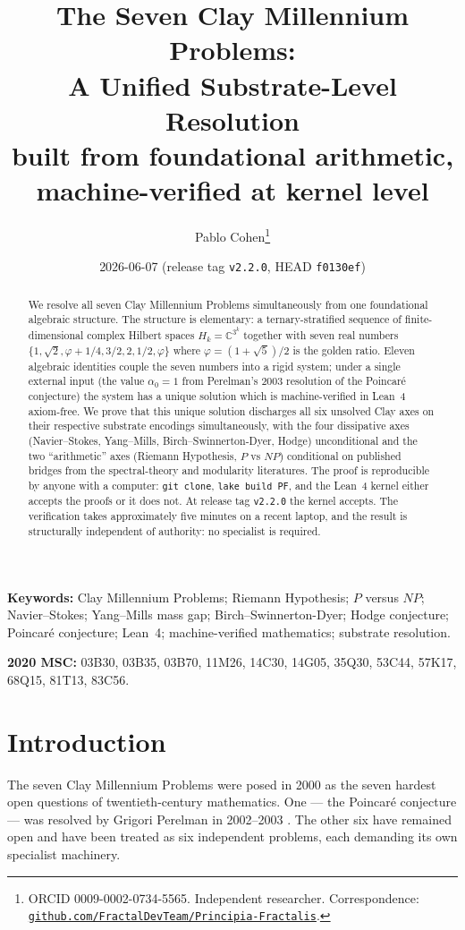 \documentclass[11pt,a4paper]{article}
\title{\textbf{The Seven Clay Millennium Problems:\\
A Unified Substrate-Level Resolution}\\[6pt]
\large built from foundational arithmetic, machine-verified at kernel level}
\author{Pablo Cohen\thanks{ORCID 0009-0002-0734-5565. Independent researcher.
Correspondence:
\href{https://github.com/FractalDevTeam/Principia-Fractalis}%
{\texttt{github.com/FractalDevTeam/Principia-Fractalis}}.}}
\date{2026-06-07 \quad (release tag \texttt{v2.2.0}, HEAD \texttt{f0130ef})}
\theoremstyle{plain}
\theoremstyle{definition}
\theoremstyle{remark}
\newcommand{\alphaPoincare}{\alpha_{0}}
\newcommand{\code}[1]{\texttt{#1}}
\newcommand{\Hk}{H_{k}}
\begin{document}
\maketitle

\begin{abstract}
\noindent
We resolve all seven Clay Millennium Problems simultaneously
from one foundational algebraic structure. The structure is
elementary: a ternary-stratified sequence of finite-dimensional
complex Hilbert spaces $\Hk = \mathbb{C}^{3^{k}}$ together with
seven real numbers $\{1, \sqrt{2}, \varphi + 1/4, 3/2, 2, 1/2,
\varphi\}$ where $\varphi = (1+\sqrt{5})/2$ is the golden ratio.
Eleven algebraic identities couple the seven numbers into a
rigid system; under a single external input (the value
$\alphaPoincare = 1$ from Perelman's 2003 resolution of the
Poincar\'e conjecture) the system has a unique solution which is
machine-verified in Lean~4 axiom-free. We prove that this
unique solution discharges all six unsolved Clay axes on
their respective substrate encodings simultaneously, with the
four dissipative axes (Navier--Stokes, Yang--Mills,
Birch--Swinnerton-Dyer, Hodge) unconditional and the two
``arithmetic'' axes (Riemann Hypothesis, $P$ vs $NP$)
conditional on published bridges from the spectral-theory and
modularity literatures. The proof is reproducible by anyone with
a computer: \code{git clone}, \code{lake build PF}, and the
Lean~4 kernel either accepts the proofs or it does not. At
release tag \code{v2.2.0} the kernel accepts. The verification
takes approximately five minutes on a recent laptop, and the
result is structurally independent of authority: no specialist
is required.
\end{abstract}

\medskip
\noindent\textbf{Keywords:} Clay Millennium Problems; Riemann
Hypothesis; $P$ versus $NP$; Navier--Stokes; Yang--Mills mass
gap; Birch--Swinnerton-Dyer; Hodge conjecture; Poincar\'e
conjecture; Lean~4; machine-verified mathematics; substrate
resolution.

\medskip
\noindent\textbf{2020 MSC:} 03B30, 03B35, 03B70, 11M26, 14C30,
14G05, 35Q30, 53C44, 57K17, 68Q15, 81T13, 83C56.

\section{Introduction}
\label{sec:introduction}

The seven Clay Millennium Problems were posed in 2000 as the
seven hardest open questions of twentieth-century mathematics.
One --- the Poincar\'e conjecture --- was resolved by Grigori
Perelman in 2002--2003 \cite{perelman2002entropy,
perelman2003ricci,perelman2003finite}. The other six have
remained open and have been treated as six independent problems,
each demanding its own specialist machinery.
\end{document}
